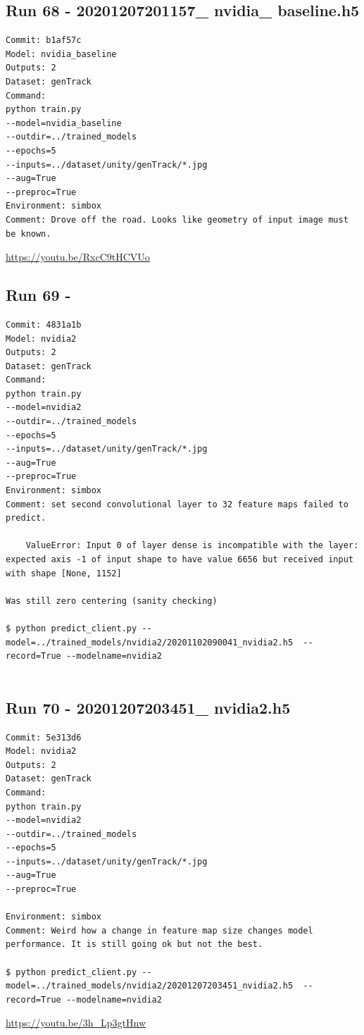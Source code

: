 \subsection{Run 68 - 20201207201157\_ nvidia\_ baseline.h5 }
\begin{verbatim}
Commit: b1af57c
Model: nvidia_baseline
Outputs: 2
Dataset: genTrack
Command:
python train.py
--model=nvidia_baseline
--outdir=../trained_models
--epochs=5
--inputs=../dataset/unity/genTrack/*.jpg
--aug=True
--preproc=True
Environment: simbox
Comment: Drove off the road. Looks like geometry of input image must be known.
\end{verbatim}
\url{https://youtu.be/RxcC9tHCVUo}



\subsection{Run 69 - }
\begin{verbatim}
Commit: 4831a1b
Model: nvidia2
Outputs: 2
Dataset: genTrack
Command:
python train.py
--model=nvidia2
--outdir=../trained_models
--epochs=5
--inputs=../dataset/unity/genTrack/*.jpg
--aug=True
--preproc=True
Environment: simbox
Comment: set second convolutional layer to 32 feature maps failed to predict.

    ValueError: Input 0 of layer dense is incompatible with the layer: expected axis -1 of input shape to have value 6656 but received input with shape [None, 1152]

Was still zero centering (sanity checking)

$ python predict_client.py --model=../trained_models/nvidia2/20201102090041_nvidia2.h5  --record=True --modelname=nvidia2


\end{verbatim}

\subsection{Run 70 - 20201207203451\_ nvidia2.h5 }
\begin{verbatim}
Commit: 5e313d6 
Model: nvidia2
Outputs: 2
Dataset: genTrack   
Command:
python train.py
--model=nvidia2
--outdir=../trained_models
--epochs=5
--inputs=../dataset/unity/genTrack/*.jpg
--aug=True
--preproc=True

Environment: simbox
Comment: Weird how a change in feature map size changes model performance. It is still going ok but not the best.

$ python predict_client.py --model=../trained_models/nvidia2/20201207203451_nvidia2.h5  --record=True --modelname=nvidia2

\end{verbatim}
\url{https://youtu.be/3h_Lp3gtHnw}


